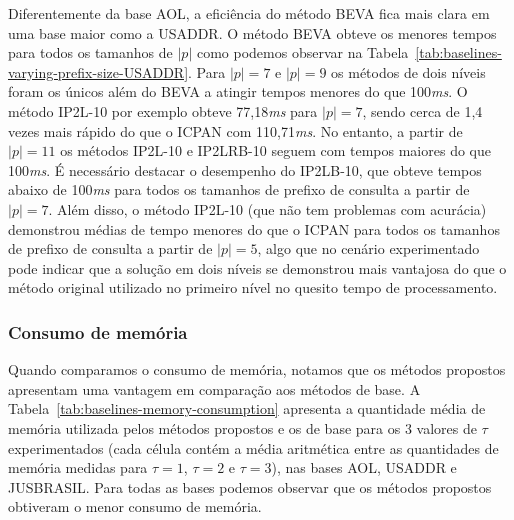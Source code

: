 Diferentemente da base AOL, a eficiência do método BEVA fica mais clara em uma base maior como a USADDR. O método BEVA obteve os menores tempos para todos os tamanhos de $|p|$ como podemos observar na Tabela~\ref{tab:baselines-varying-prefix-size-USADDR}. Para $|p|=7$ e $|p|=9$ os métodos de dois níveis foram os únicos além do BEVA a atingir tempos menores do que 100\textit{ms}. O método IP2L-10 por exemplo obteve 77,18\textit{ms} para $|p|=7$, sendo cerca de 1,4 vezes mais rápido do que o ICPAN com 110,71\textit{ms}. No entanto, a partir de $|p|=11$ os métodos IP2L-10 e IP2LRB-10 seguem com tempos maiores do que 100\textit{ms}. É necessário destacar o desempenho do IP2LB-10, que obteve tempos abaixo de 100\textit{ms} para todos os tamanhos de prefixo de consulta a partir de $|p|=7$. Além disso, o método IP2L-10 (que não tem problemas com acurácia) demonstrou médias de tempo menores do que o ICPAN para todos os tamanhos de prefixo de consulta a partir de $|p|=5$, algo que no cenário experimentado pode indicar que a solução em dois níveis se demonstrou mais vantajosa do que o método original utilizado no primeiro nível no quesito tempo de processamento.

\subsubsection{Consumo de memória}

Quando comparamos o consumo de memória, notamos que os métodos propostos apresentam uma vantagem em comparação aos métodos de base. A Tabela~\ref{tab:baselines-memory-consumption} apresenta a quantidade média de memória utilizada pelos métodos propostos e os de base para os 3 valores de $\tau$ experimentados (cada célula contém a média aritmética entre as quantidades de memória medidas para $\tau=1$, $\tau=2$ e $\tau=3$), nas bases AOL, USADDR e JUSBRASIL. Para todas as bases podemos observar que os métodos propostos obtiveram o menor consumo de memória. 

